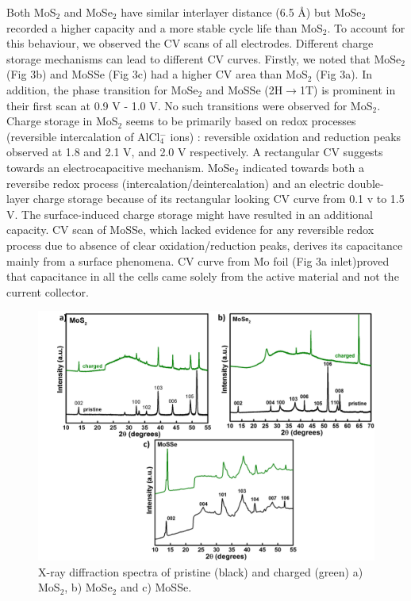 \documentclass[num-refs]{wiley-article}
\begin{document}
Both MoS$_2$ and MoSe$_2$ have similar interlayer distance (6.5 \AA) but MoSe$_2$ recorded a higher capacity and a more stable cycle life than MoS$_2$. To account for this behaviour, we observed the CV scans of all electrodes. Different charge storage mechanisms can lead to different CV curves. Firstly, we noted that MoSe$_2$ (Fig 3b) and MoSSe (Fig 3c) had a higher CV area than MoS$_2$ (Fig 3a). In addition, the phase transition for MoSe$_2$ and MoSSe (2H$\rightarrow$1T) is prominent in their first scan at 0.9 V - 1.0 V. No such transitions were observed for MoS$_2$. Charge storage in MoS$_2$ seems to be primarily based on redox processes (reversible intercalation of AlCl$_4^-$ ions) : reversible oxidation and reduction peaks observed at 1.8 and 2.1 V, and 2.0 V respectively. A rectangular CV suggests towards an electrocapacitive mechanism. MoSe$_2$ indicated towards both a reversibe redox process (intercalation/deintercalation) and an electric double-layer charge storage because of its rectangular looking CV curve from 0.1 v to 1.5 V. The surface-induced charge storage might have resulted in an additional capacity.  CV scan of MoSSe, which lacked evidence for any reversible redox process due to absence of clear oxidation/reduction peaks, derives its capacitance mainly from a surface phenomena. CV curve from Mo foil (Fig 3a inlet)proved that capacitance in all the cells came solely from the active material and not the current collector.
\begin{figure}[h!]
\centering
\includegraphics[width=\textwidth]{figures/fig3}
\caption{X-ray diffraction spectra of pristine (black) and charged (green) a) MoS$_2$, b) MoSe$_2$ and c) MoSSe.}
\end{figure}
\end{document}
